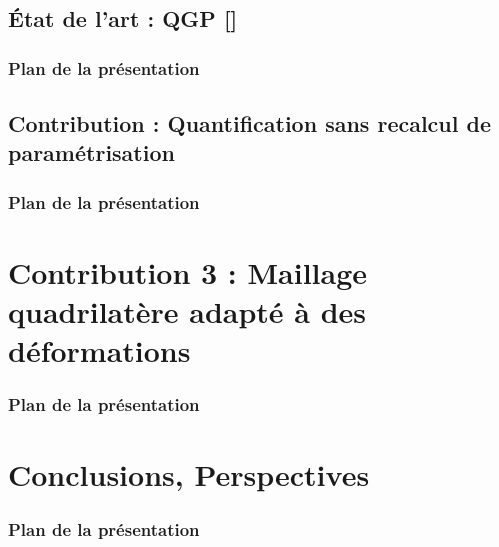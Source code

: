 \documentclass{beamer}
\begin{document}
\subsection{État de l'art : QGP [\cite{campen_quantized_2015}]}
\begin{frame}
    \frametitle{Plan de la présentation}
    \tableofcontents[currentsubsection, sectionstyle=show/shaded, subsectionstyle=show/shaded/hide]
\end{frame}

\subsection{Contribution : Quantification sans recalcul de paramétrisation}
\begin{frame}
    \frametitle{Plan de la présentation}
    \tableofcontents[currentsubsection, sectionstyle=show/shaded, subsectionstyle=show/shaded/hide]
\end{frame}


\section{Contribution 3 : Maillage quadrilatère adapté à des déformations}
\begin{frame}
    \frametitle{Plan de la présentation}
    \tableofcontents[currentsection, sectionstyle=show/shaded, subsectionstyle=show/show/hide]
\end{frame}


\section{Conclusions, Perspectives}
\begin{frame}
    \frametitle{Plan de la présentation}
    \tableofcontents[currentsection, sectionstyle=show/shaded, subsectionstyle=show/show/hide]
\end{frame}

\end{document}
